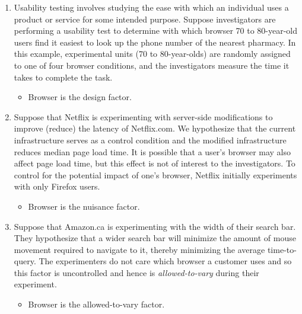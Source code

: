 \begin{enumerate}
      \item Usability testing involves studying the ease with which an individual uses a product or service
            for some intended purpose. Suppose investigators are performing a usability test to determine
            with which browser 70 to 80-year-old users find it easiest to look up the phone number of
            the nearest pharmacy. In this example, experimental units (70 to 80-year-olds) are randomly
            assigned to one of four browser conditions, and the investigators measure the time it
            takes to complete the task.
            \begin{itemize}
                  \item Browser is the design factor.
            \end{itemize}
      \item Suppose that Netflix is experimenting with server-side modifications to improve (reduce) the
            latency of Netflix.com. We hypothesize that the current infrastructure serves as a control condition
            and the modified infrastructure reduces median page load time. It is possible
            that a user's browser may also affect page load time, but this effect is not of interest to
            the investigators. To control for the potential impact of one's browser, Netflix initially
            experiments with only Firefox users.
            \begin{itemize}
                  \item Browser is the nuisance factor.
            \end{itemize}
      \item Suppose that Amazon.ca is experimenting with the width of their search bar. They hypothesize
            that a wider search bar will minimize the amount of mouse movement required to
            navigate to it, thereby minimizing the average time-to-query. The experimenters do not care
            which browser a customer uses and so this factor is uncontrolled and hence is \emph{allowed-to-vary}
            during their experiment.
            \begin{itemize}
                  \item Browser is the allowed-to-vary factor.
            \end{itemize}
\end{enumerate}
